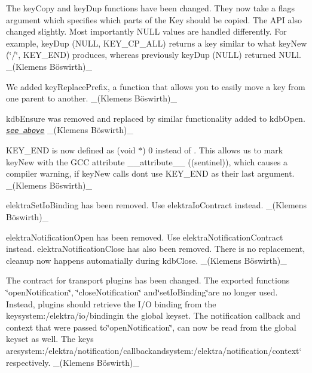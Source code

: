 \begin{DoxyItemize}
\item The {\ttfamily key\+Copy} and {\ttfamily key\+Dup} functions have been changed. They now take a {\ttfamily flags} argument which specifies which parts of the {\ttfamily Key} should be copied. The A\+PI also changed slightly. Most importantly {\ttfamily N\+U\+LL} values are handled differently. For example, {\ttfamily key\+Dup (N\+U\+LL, K\+E\+Y\+\_\+\+C\+P\+\_\+\+A\+LL)} returns a key similar to what {\ttfamily key\+New (\char`\"{}/\char`\"{}, K\+E\+Y\+\_\+\+E\+ND)} produces, whereas previously {\ttfamily key\+Dup (N\+U\+LL)} returned {\ttfamily N\+U\+Ll}. \+\_\+(Klemens Böswirth)\+\_\+
\item We added {\ttfamily key\+Replace\+Prefix}, a function that allows you to easily move a key from one parent to another. \+\_\+(Klemens Böswirth)\+\_\+
\item {\ttfamily kdb\+Ensure} was removed and replaced by similar functionality added to {\ttfamily kdb\+Open}. {\itshape \href{#hl-1}{\tt see above}} \+\_\+(Klemens Böswirth)\+\_\+
\item {\ttfamily K\+E\+Y\+\_\+\+E\+ND} is now defined as {\ttfamily (void $\ast$) 0} instead of {}. This allows us to mark {\ttfamily key\+New} with the G\+CC attribute {\ttfamily \+\_\+\+\_\+attribute\+\_\+\+\_\+ ((sentinel))}, which causes a compiler warning, if {\ttfamily key\+New} calls don\textquotesingle{}t use {\ttfamily K\+E\+Y\+\_\+\+E\+ND} as their last argument. \+\_\+(Klemens Böswirth)\+\_\+
\end{DoxyItemize}


\begin{DoxyItemize}
\item {\ttfamily elektra\+Set\+Io\+Binding} has been removed. Use {\ttfamily elektra\+Io\+Contract} instead. \+\_\+(Klemens Böswirth)\+\_\+
\end{DoxyItemize}


\begin{DoxyItemize}
\item {\ttfamily elektra\+Notification\+Open} has been removed. Use {\ttfamily elektra\+Notification\+Contract} instead. {\ttfamily elektra\+Notification\+Close} has also been removed. There is no replacement, cleanup now happens automatially during {\ttfamily kdb\+Close}. \+\_\+(Klemens Böswirth)\+\_\+
\item The contract for transport plugins has been changed. The exported functions {\ttfamily \char`\"{}open\+Notification\char`\"{}}, {\ttfamily \char`\"{}close\+Notification\char`\"{} and}\char`\"{}set\+Io\+Binding\char`\"{}{\ttfamily are no longer used. Instead, plugins should retrieve the I/O binding from the key}system\+:/elektra/io/binding{\ttfamily in the global keyset. The notification callback and context that were passed to}\char`\"{}open\+Notification\char`\"{}{\ttfamily , can now be read from the global keyset as well. The keys are}system\+:/elektra/notification/callback{\ttfamily and}system\+:/elektra/notification/context` respectively. \+\_\+(Klemens Böswirth)\+\_\+
\end{DoxyItemize}

